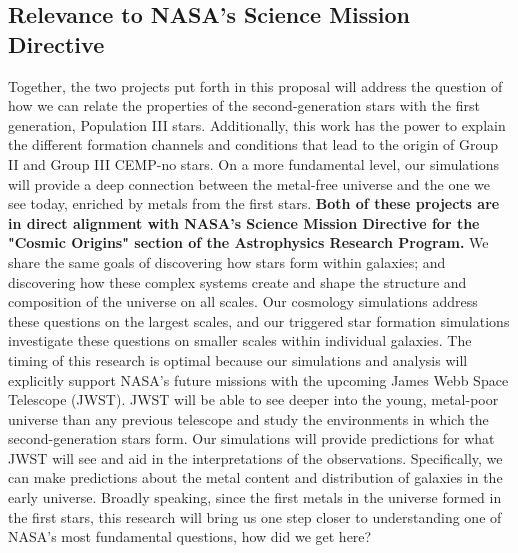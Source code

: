 \documentclass[letterpaper, 12pt]{article}
\begin{document}
\subsection*{Relevance to NASA's Science Mission Directive}
Together, the two projects put forth in this proposal will address the question of how we can relate the properties of the second-generation stars with the first generation, Population III stars. Additionally, this work has the power to explain the different formation channels and conditions that lead to the origin of Group II and Group III CEMP-no stars. On a more fundamental level, our simulations will provide a deep connection between the metal-free universe and the one we see today, enriched by metals from the first stars. \textbf{Both of these projects are in direct alignment with NASA's Science Mission Directive for the "Cosmic Origins" section of the Astrophysics Research Program.} We share the same goals of discovering how stars form within galaxies; and discovering how these complex systems create and shape the structure and composition of the universe on all scales. Our cosmology simulations address these questions on the largest scales, and our triggered star formation simulations investigate these questions on smaller scales within individual galaxies. The timing of this research is optimal because our simulations and analysis will explicitly support NASA's future missions with the upcoming James Webb Space Telescope (JWST). JWST will be able to see deeper into the young, metal-poor universe than any previous telescope and study the environments in which the second-generation stars form. Our simulations will provide predictions for what JWST will see and aid in the interpretations of the observations. Specifically, we can make predictions about the metal content and distribution of galaxies in the early universe. Broadly speaking, since the first metals in the universe formed in the first stars, this research will bring us one step closer to understanding one of NASA's most fundamental questions, how did we get here?


\end{document}
